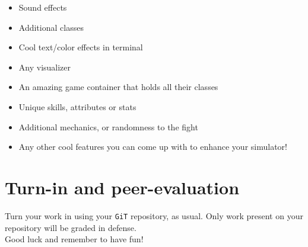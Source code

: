 \documentclass{42-en}
\begin{document}
	\begin{itemize}
		\item Sound effects
		\item Additional classes
		\item Cool text/color effects in terminal
		\item Any visualizer
		\item An amazing game container that holds all their classes
		\item Unique skills, attributes or stats
		\item Additional mechanics, or randomness to the fight 
		\item Any other cool features you can come up with to enhance
		your simulator!	
	\end{itemize}



\chapter{Turn-in and peer-evaluation}

    Turn your work in using your \texttt{GiT} repository, as
    usual. Only work present on your repository will be graded in defense.\\

	Good luck and remember to have fun!



\end{document}
